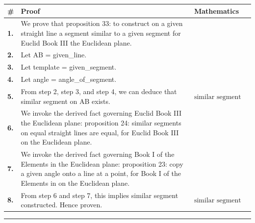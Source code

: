 \documentclass[11pt]{article}
\theoremstyle{definition}
\begin{document}
\begin{tabular}{@{} >{\raggedright\arraybackslash}p{} >{\raggedright\arraybackslash}p{} >{\raggedleft\arraybackslash}p{} @{}}
\textbf{\#} & \textbf{Proof} & \textbf{Mathematics} \\
\midrule
\textbf{1.} & We prove that proposition 33: to construct on a given straight line a segment similar to a given segment for Euclid Book III the Euclidean plane. & \\[0.45em]
\textbf{2.} & Let AB = given\_line. & \\[0.45em]
\textbf{3.} & Let template = given\_segment. & \\[0.45em]
\textbf{4.} & Let angle = angle\_of\_segment. & \\[0.45em]
\textbf{5.} & From step 2, step 3, and step 4, we can deduce that similar segment on AB exists. & $\displaystyle \text{similar segment on AB exists}$ \\[0.45em]
\textbf{6.} & We invoke the derived fact governing Euclid Book III the Euclidean plane: proposition 24: similar segments on equal straight lines are equal, for Euclid Book III on the Euclidean plane. & \\[0.45em]
\textbf{7.} & We invoke the derived fact governing Book I of the Elements in the Euclidean plane: proposition 23: copy a given angle onto a line at a point, for Book I of the Elements in on the Euclidean plane. & \\[0.45em]
\textbf{8.} & From step 6 and step 7, this implies similar segment constructed. Hence proven. & $\displaystyle \text{similar segment constructed}$ \\[0.45em]
\bottomrule
\end{tabular}
\label{thm:Geometry-Euclid Book III-proposition_33_to_construct_on_a_given_straight_line_a_segment_similar_to_a_given_segment}
\par\medskip\hrule
\end{document}
